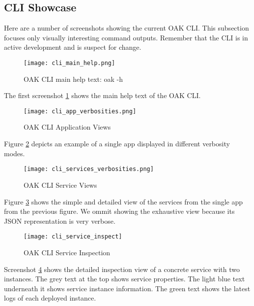 \subsection{CLI Showcase}

Here are a number of screenshots showing the current OAK CLI.
This subsection focuses only visually interesting command outputs. 
Remember that the CLI is in active development and is suspect for change.

\begin{figure}[h]
    \begin{adjustwidth}{-0.1\paperwidth}{-0.1\paperwidth}
        \centering
        \texttt{[image: cli\_main\_help.png]}
        \caption{OAK CLI main help text: oak -h}
        \label{fig:cli_main_help}
    \end{adjustwidth}
\end{figure}
The first screenshot \ref{fig:cli_main_help} shows the main help text of the OAK CLI.

\begin{figure}[h]
    \begin{adjustwidth}{-0.2\paperwidth}{-0.2\paperwidth}
        \centering
        \texttt{[image: cli\_app\_verbosities.png]}
        \caption{OAK CLI Application Views}
        \label{fig:cli_app_views}
    \end{adjustwidth}
\end{figure}
Figure \ref{fig:cli_app_views} depicts an example of a single app displayed in different verbosity modes.

\begin{figure}[h]
        \centering
        \texttt{[image: cli\_services\_verbosities.png]}
        \caption{OAK CLI Service Views}
        \label{fig:cli_service_views}
\end{figure}
Figure \ref{fig:cli_service_views} shows the simple and detailed view of the services from the single app from the previous figure.
We ommit showing the exhaustive view because its JSON representation is very verbose.

\begin{figure}[p]
    \begin{adjustwidth}{-0.1\paperwidth}{-0.1\paperwidth}
        \centering
        \texttt{[image: cli\_service\_inspect]}
        \caption{OAK CLI Service Inspection}
        \label{fig:cli_service_inspection}
    \end{adjustwidth}
\end{figure}
Screenshot \ref{fig:cli_service_inspection} shows the detailed inspection view of a concrete service with two instances.
The grey text at the top shows service properties.
The light blue text underneath it shows service instance information.
The green text shows the latest logs of each deployed instance.